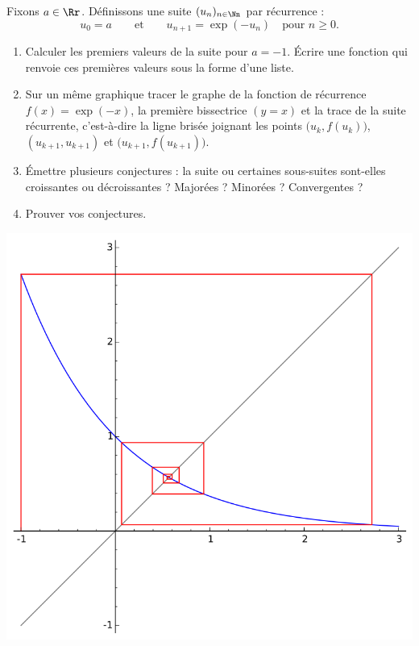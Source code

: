 \documentclass[class=report,crop=false]{standalone}
\begin{document}
\begin{tp}
Fixons $a\in\Rr$. Définissons une suite $(u_n)_{n\in\Nn}$ par récurrence :
$$u_0 = a \qquad \text{et} \qquad u_{n+1} = \exp(-u_n) \quad \text{pour } n\ge 0.$$
\begin{enumerate}
  \item Calculer les premiers valeurs de la suite pour $a=-1$. 
  \'Ecrire une fonction qui renvoie ces premières valeurs sous la forme d'une liste.
  
  \item Sur un même graphique tracer le graphe de la fonction de récurrence $f(x) = \exp(-x)$, la première bissectrice $(y=x)$
  et la trace de la suite récurrente, c'est-à-dire la ligne brisée 
  joignant les points $\big(u_k,f(u_k)\big)$, $(u_{k+1},u_{k+1})$ et $\big(u_{k+1},f(u_{k+1})\big)$.
 
  \item \'Emettre plusieurs conjectures : la suite ou certaines sous-suites sont-elles
  croissantes ou décroissantes ? Majorées ? Minorées ? Convergentes ?
  
  \item Prouver vos conjectures.
\end{enumerate}

\end{tp}
\begin{center}
\includegraphics[scale=0.6]{figures/suites-visual1}
\end{center}
\end{document}
